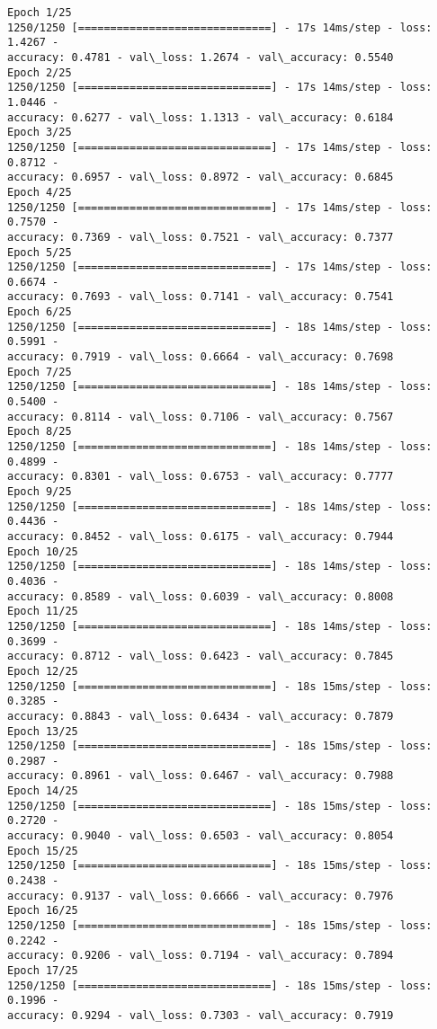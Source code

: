 \documentclass[11pt]{article}
\begin{document}
    \begin{Verbatim}[commandchars=\\\{\}]
Epoch 1/25
1250/1250 [==============================] - 17s 14ms/step - loss: 1.4267 -
accuracy: 0.4781 - val\_loss: 1.2674 - val\_accuracy: 0.5540
Epoch 2/25
1250/1250 [==============================] - 17s 14ms/step - loss: 1.0446 -
accuracy: 0.6277 - val\_loss: 1.1313 - val\_accuracy: 0.6184
Epoch 3/25
1250/1250 [==============================] - 17s 14ms/step - loss: 0.8712 -
accuracy: 0.6957 - val\_loss: 0.8972 - val\_accuracy: 0.6845
Epoch 4/25
1250/1250 [==============================] - 17s 14ms/step - loss: 0.7570 -
accuracy: 0.7369 - val\_loss: 0.7521 - val\_accuracy: 0.7377
Epoch 5/25
1250/1250 [==============================] - 17s 14ms/step - loss: 0.6674 -
accuracy: 0.7693 - val\_loss: 0.7141 - val\_accuracy: 0.7541
Epoch 6/25
1250/1250 [==============================] - 18s 14ms/step - loss: 0.5991 -
accuracy: 0.7919 - val\_loss: 0.6664 - val\_accuracy: 0.7698
Epoch 7/25
1250/1250 [==============================] - 18s 14ms/step - loss: 0.5400 -
accuracy: 0.8114 - val\_loss: 0.7106 - val\_accuracy: 0.7567
Epoch 8/25
1250/1250 [==============================] - 18s 14ms/step - loss: 0.4899 -
accuracy: 0.8301 - val\_loss: 0.6753 - val\_accuracy: 0.7777
Epoch 9/25
1250/1250 [==============================] - 18s 14ms/step - loss: 0.4436 -
accuracy: 0.8452 - val\_loss: 0.6175 - val\_accuracy: 0.7944
Epoch 10/25
1250/1250 [==============================] - 18s 14ms/step - loss: 0.4036 -
accuracy: 0.8589 - val\_loss: 0.6039 - val\_accuracy: 0.8008
Epoch 11/25
1250/1250 [==============================] - 18s 14ms/step - loss: 0.3699 -
accuracy: 0.8712 - val\_loss: 0.6423 - val\_accuracy: 0.7845
Epoch 12/25
1250/1250 [==============================] - 18s 15ms/step - loss: 0.3285 -
accuracy: 0.8843 - val\_loss: 0.6434 - val\_accuracy: 0.7879
Epoch 13/25
1250/1250 [==============================] - 18s 15ms/step - loss: 0.2987 -
accuracy: 0.8961 - val\_loss: 0.6467 - val\_accuracy: 0.7988
Epoch 14/25
1250/1250 [==============================] - 18s 15ms/step - loss: 0.2720 -
accuracy: 0.9040 - val\_loss: 0.6503 - val\_accuracy: 0.8054
Epoch 15/25
1250/1250 [==============================] - 18s 15ms/step - loss: 0.2438 -
accuracy: 0.9137 - val\_loss: 0.6666 - val\_accuracy: 0.7976
Epoch 16/25
1250/1250 [==============================] - 18s 15ms/step - loss: 0.2242 -
accuracy: 0.9206 - val\_loss: 0.7194 - val\_accuracy: 0.7894
Epoch 17/25
1250/1250 [==============================] - 18s 15ms/step - loss: 0.1996 -
accuracy: 0.9294 - val\_loss: 0.7303 - val\_accuracy: 0.7919

\end{Verbatim}
\end{document}
